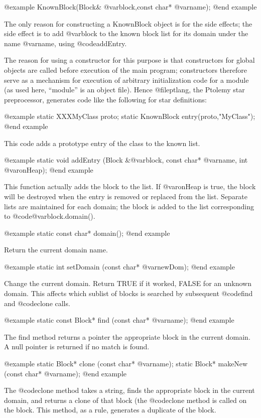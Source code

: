 @example
KnownBlock(Block& @var{block},const char* @var{name});
@end example

The only reason for constructing a KnownBlock object is for the side
effects; the side effect is to add @var{block} to the known block list
for its domain under the name @var{name}, using @code{addEntry}.

The reason for using a constructor for this purpose is that constructors
for global objects are called before execution of the main program;
constructors therefore serve as a mechanism for execution of arbitrary
initialization code for a module (as used here, ``module'' is an object
file).  Hence @file{ptlang}, the Ptolemy star preprocessor, generates
code like the following for star definitions:

@example
static XXXMyClass proto;
static KnownBlock entry(proto,"MyClass");
@end example

This code adds a prototype entry of the class to the known list.

@example
static void addEntry (Block &@var{block}, const char* @var{name}, int @var{onHeap});
@end example

This function actually adds the block to the list.  If @var{onHeap} is true,
the block will be destroyed when the entry is removed or replaced from
the list.  Separate lists are maintained for each domain; the block
is added to the list corresponding to @code{@var{block}.domain()}.

@example
static const char* domain();
@end example

Return the current domain name.

@example
static int setDomain (const char* @var{newDom});
@end example

Change the current domain.  Return TRUE if it worked, FALSE for an
unknown domain.  This affects which sublist of blocks is searched by
subsequent @code{find} and @code{clone} calls.

@example
static const Block* find (const char* @var{name});
@end example

The find method returns a pointer the appropriate block in
the current domain.  A null pointer is returned if no match
is found.

@example
static Block* clone (const char* @var{name});
static Block* makeNew (const char* @var{name});
@end example

The @code{clone} method takes a string, finds the appropriate block in
the current domain, and returns a clone of that block (the
@code{clone} method is called on the block.  This method, as
a rule, generates a duplicate of the block.

